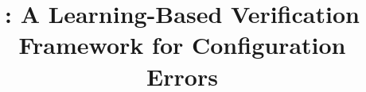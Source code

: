 \documentclass{llncs}
\begin{document}
\setlength{\pdfpageheight}{\paperheight}
\setlength{\pdfpagewidth}{\paperwidth}





\title{\app: A Learning-Based Verification Framework for Configuration
Errors}

\author{\xspace}
\institute{\xspace}

\maketitle

%





%



%










\end{document}
